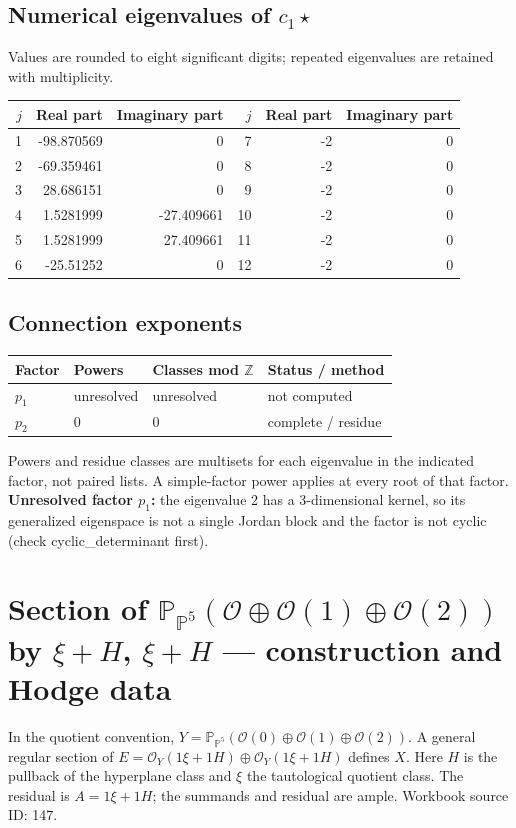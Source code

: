 \documentclass[10pt,a4paper]{article}
\begin{document}
\subsection*{Numerical eigenvalues of $c_1\star$}
Values are rounded to eight significant digits; repeated eigenvalues are retained with multiplicity.
\begin{center}\small\begin{tabular}{rrr@{\qquad}rrr}\toprule $j$ & Real part & Imaginary part & $j$ & Real part & Imaginary part\\\midrule
1 & -98.870569 & 0 & 7 & -2 & 0\\
2 & -69.359461 & 0 & 8 & -2 & 0\\
3 & 28.686151 & 0 & 9 & -2 & 0\\
4 & 1.5281999 & -27.409661 & 10 & -2 & 0\\
5 & 1.5281999 & 27.409661 & 11 & -2 & 0\\
6 & -25.51252 & 0 & 12 & -2 & 0\\
\bottomrule\end{tabular}\end{center}
\subsection*{Connection exponents}
\begin{center}\begin{tabular}{llll}\toprule Factor & Powers & Classes mod $\mathbb Z$ & Status / method\\\midrule
$p_{1}$ & unresolved & unresolved & not computed\\
$p_{2}$ & $0$ & $0$ & complete / residue\\
\bottomrule\end{tabular}\end{center}
Powers and residue classes are multisets for each eigenvalue in the indicated factor, not paired lists. A simple-factor power applies at every root of that factor.
\textbf{Unresolved factor $p_{1}$:} the eigenvalue 2 has a 3-dimensional kernel, so its generalized eigenspace is not a single Jordan block and the factor is not cyclic (check cyclic\_determinant first).
\clearpage\section*{Section of $\mathbb P_{\mathbb P^{5}}(\mathcal O\oplus \mathcal O(1)\oplus \mathcal O(2))$ by $\xi +H$, $\xi +H$ --- construction and Hodge data}\label{entry:PB5-147}
In the quotient convention, $Y=\mathbb P_{\mathbb P^{5}}(\mathcal O(0)\oplus\mathcal O(1)\oplus\mathcal O(2))$.
A general regular section of $E=\mathcal O_Y(1\xi+1H)\oplus\mathcal O_Y(1\xi+1H)$ defines $X$.
Here $H$ is the pullback of the hyperplane class and $\xi$ the tautological quotient class. The residual is $A=1\xi+1H$; the summands and residual are ample.
Workbook source ID: 147.
\end{document}
